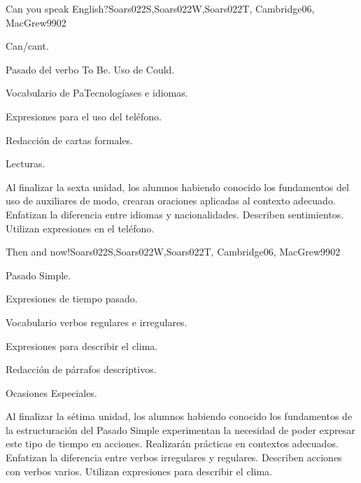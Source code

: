 \begin{syllabus}
\begin{unit}{Can you speak English?}{Soars022S,Soars022W,Soars022T, Cambridge06, MacGrew99}{0}{2}
   \begin{topics}
      \item Can/cant.
      \item Pasado del verbo To Be. Uso de Could.
      \item Vocabulario de PaTecnologíases e idiomas.
      \item Expresiones para el uso del teléfono.
      \item Redacción de cartas formales.
      \item Lecturas.
   \end{topics}

   \begin{unitgoals}
      \item Al finalizar la sexta unidad, los alumnos habiendo conocido los fundamentos del uso de auxiliares de modo, crearan oraciones aplicadas al contexto adecuado. Enfatizan la diferencia entre idiomas y nacionalidades. Describen sentimientos. Utilizan expresiones en el teléfono.
   \end{unitgoals}

\end{unit}

\begin{unit}{Then and now!}{Soars022S,Soars022W,Soars022T, Cambridge06, MacGrew99}{0}{2}
   \begin{topics}
      \item Pasado Simple.
      \item Expresiones de tiempo pasado.
      \item Vocabulario verbos regulares e irregulares.
      \item Expresiones para describir el clima. 
      \item Redacción de párrafos descriptivos.
      \item Ocasiones Especiales.
   \end{topics}

   \begin{unitgoals}
      \item Al finalizar la sétima unidad, los alumnos habiendo conocido los fundamentos de la estructuración del Pasado Simple experimentan la necesidad de poder expresar este tipo de tiempo en acciones. Realizarán prácticas en contextos adecuados. Enfatizan la diferencia entre verbos irregulares y regulares. Describen acciones con verbos varios. Utilizan expresiones para describir el clima.
   \end{unitgoals}
\end{unit}



\begin{coursebibliography}
\end{coursebibliography}
\end{syllabus}
%
